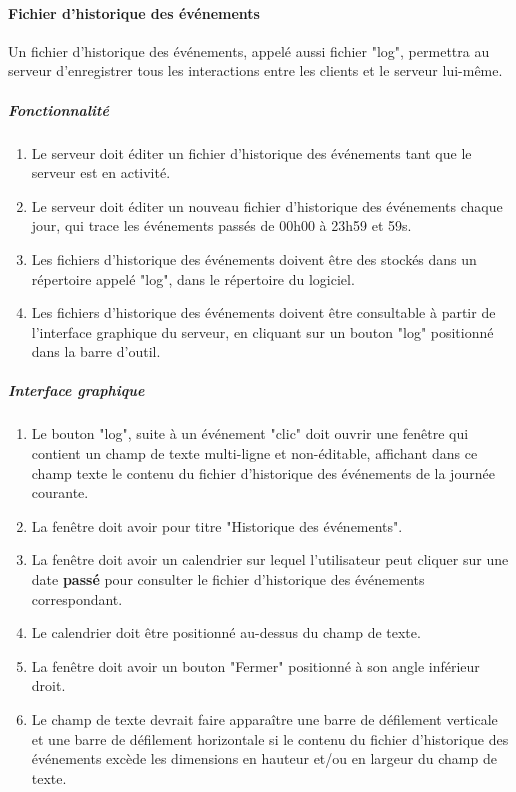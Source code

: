 \documentclass[10pt,a4paper]{report}
\begin{document}
\paragraph{Fichier d'historique des événements}

Un fichier d'historique des événements, appelé aussi fichier "log", permettra au serveur d'enregistrer tous les interactions entre les clients et le serveur lui-même.

	\subparagraph{Fonctionnalité}
		\begin{enumerate}
		
			\item Le serveur doit éditer un fichier d'historique des événements tant que le serveur est en activité.
		
			\item Le serveur doit éditer un nouveau fichier d'historique des événements chaque jour, qui trace les événements passés de 00h00 à 23h59 et 59s.
		
			\item Les fichiers d'historique des événements doivent être des stockés dans un répertoire appelé "log", dans le répertoire du logiciel.
		
			\item Les fichiers d'historique des événements doivent être consultable à partir de l'interface graphique du serveur, en cliquant sur un bouton "log" positionné dans la barre d'outil.
			
		\end{enumerate}
		
		\subparagraph{Interface graphique}
			\begin{enumerate}
		
			\item Le bouton "log", suite à un événement "clic" doit ouvrir une fenêtre qui contient un champ de texte multi-ligne et non-éditable, affichant dans ce champ texte le contenu du fichier d'historique des événements de la journée courante.
		
			\item La fenêtre doit avoir pour titre "Historique des événements".
		
			\item La fenêtre doit avoir un calendrier sur lequel l'utilisateur peut cliquer sur une date \textbf{passé} pour consulter le fichier d'historique des événements correspondant.
		
			\item Le calendrier doit être positionné au-dessus du champ de texte.
		
			\item La fenêtre doit avoir un bouton "Fermer" positionné à son angle inférieur droit.
			\item Le champ de texte devrait faire apparaître une barre de défilement verticale et une barre de défilement horizontale si le contenu du fichier d'historique des événements excède les dimensions en hauteur et/ou en largeur du champ de texte.
		\end{enumerate}
		
\end{document}
